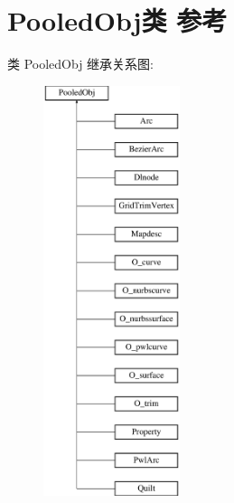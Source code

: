 \hypertarget{class_pooled_obj}{}\section{Pooled\+Obj类 参考}
\label{class_pooled_obj}
类 Pooled\+Obj 继承关系图\+:\begin{figure}[H]
\begin{center}
\leavevmode
\includegraphics[height=12.000000cm]{class_pooled_obj}
\end{center}
\end{figure}
